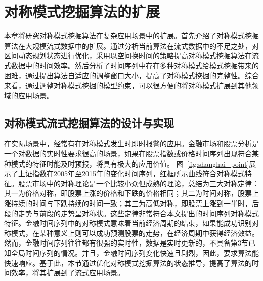 
\chapter{对称模式挖掘算法的扩展}
本章将研究对称模式挖掘算法在复杂应用场景中的扩展。首先介绍了对称模式挖掘算法在大规模流式数据中的扩展。通过分析当前算法在流式数据中的不足之处，对区间动态规划状态进行优化，采用以空间换时间的策略提高对称模式挖掘算法在流式数据中的时间效率。然后分析了时间序列中存在多种对称模式给模式挖掘带来的困难，通过提出算法自适应的调整窗口大小，提高了对称模式挖掘的完整性。综合来看，通过调整对称模式挖掘的模型约束，可以很方便的将对称模式扩展到其他领域的应用场景。

\section{对称模式流式挖掘算法的设计与实现}
在实际场景中，经常有在对称模式发生时即时报警的应用。金融市场和股票分析是一个对数据的实时性要求很高的场景，如果在股票指数或价格时间序列出现符合某种模式的特征时能及时预报，将具有极大的应用价值。
图~\ref{fig:shanghai_point}展示了上证指数在2005年至2015年的变化时间序列，红框所示曲线符合对称模式特征。股票市场中的对称理论是一个比较小众但成熟的理论，总结为三大对称定律：其一为价格对称，即股票上涨的价格和下跌的价格相同；其二为时间对称，股票上涨持续的时间与下跌持续的时间一致；其三为高低对称，即股票上涨到一半时，后段的走势与前段的走势呈对称状。这些定律非常符合本文提出的时间序列对称模式特征。金融时间序列中的对称模式意味着当前经济周期的结束，如果能成功识别对称模式，在某种意义上则可以成功预测股票的走势，在经济周期中获得经济效益。然而，金融时间序列往往都有很强的实时性，数据是实时更新的，不具备第3节已知全局时间序列的情况。并且，金融时间序列变化快速且剧烈，因此，要求算法能快速响应。基于此，本节通过优化对称模式挖掘算法的状态推导，提高了算法的时间效率，将其扩展到了流式应用场景。
